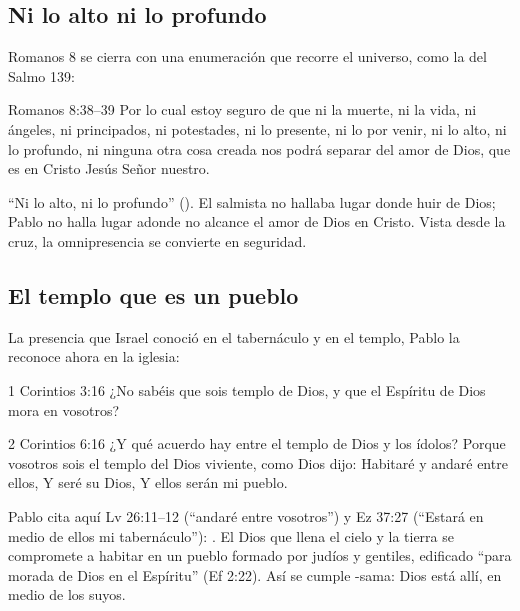 \subsection{Ni lo alto ni lo profundo}

Romanos 8 se cierra con una enumeración que recorre el universo, como la del Salmo 139:

\begin{verso}{Romanos 8:38–39}
Por lo cual estoy seguro de que ni la muerte, ni la vida, ni ángeles, ni principados, ni potestades, ni lo presente, ni lo por venir, ni lo alto, ni lo profundo, ni ninguna otra cosa creada nos podrá separar del amor de Dios, que es en Cristo Jesús Señor nuestro.
\end{verso}

``Ni lo alto, ni lo profundo'' (). El salmista no hallaba lugar donde huir de Dios; Pablo no halla lugar adonde no alcance el amor de Dios en Cristo. Vista desde la cruz, la omnipresencia se convierte en seguridad.


\subsection{El templo que es un pueblo}

La presencia que Israel conoció en el tabernáculo y en el templo, Pablo la reconoce ahora en la iglesia:

\begin{verso}{1 Corintios 3:16}
¿No sabéis que sois templo de Dios, y que el Espíritu de Dios mora en vosotros?
\end{verso}
\begin{verso}{2 Corintios 6:16}
¿Y qué acuerdo hay entre el templo de Dios y los ídolos? Porque vosotros sois el templo del Dios viviente, como Dios dijo: Habitaré y andaré entre ellos, Y seré su Dios, Y ellos serán mi pueblo.
\end{verso}

Pablo cita aquí Lv 26:11--12 (``andaré entre vosotros'') y Ez 37:27 (``Estará en medio de ellos mi tabernáculo''): . El Dios que llena el cielo y la tierra se compromete a habitar en un pueblo formado por judíos y gentiles, edificado ``para morada de Dios en el Espíritu'' (Ef 2:22). Así se cumple \SENOR{}-sama: Dios está allí, en medio de los suyos.

